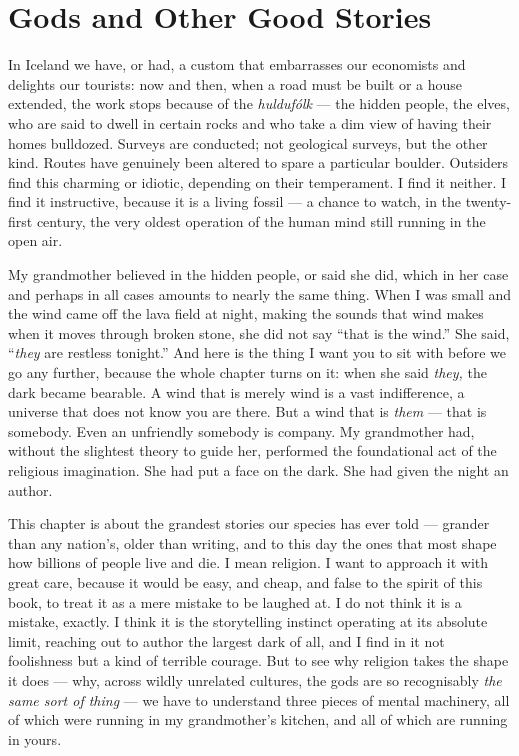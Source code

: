 \chapter{Gods and Other Good Stories}

In Iceland we have, or had, a custom that embarrasses our economists and delights our tourists: now and then, when a road must be built or a house extended, the work stops because of the \emph{huldufólk} — the hidden people, the elves, who are said to dwell in certain rocks and who take a dim view of having their homes bulldozed. Surveys are conducted; not geological surveys, but the other kind. Routes have genuinely been altered to spare a particular boulder. Outsiders find this charming or idiotic, depending on their temperament. I find it neither. I find it instructive, because it is a living fossil — a chance to watch, in the twenty-first century, the very oldest operation of the human mind still running in the open air.

My grandmother believed in the hidden people, or said she did, which in her case and perhaps in all cases amounts to nearly the same thing. When I was small and the wind came off the lava field at night, making the sounds that wind makes when it moves through broken stone, she did not say ``that is the wind.'' She said, ``\emph{they} are restless tonight.'' And here is the thing I want you to sit with before we go any further, because the whole chapter turns on it: when she said \emph{they,} the dark became bearable. A wind that is merely wind is a vast indifference, a universe that does not know you are there. But a wind that is \emph{them} — that is somebody. Even an unfriendly somebody is company. My grandmother had, without the slightest theory to guide her, performed the foundational act of the religious imagination. She had put a face on the dark. She had given the night an author.

This chapter is about the grandest stories our species has ever told — grander than any nation's, older than writing, and to this day the ones that most shape how billions of people live and die. I mean religion. I want to approach it with great care, because it would be easy, and cheap, and false to the spirit of this book, to treat it as a mere mistake to be laughed at. I do not think it is a mistake, exactly. I think it is the storytelling instinct operating at its absolute limit, reaching out to author the largest dark of all, and I find in it not foolishness but a kind of terrible courage. But to see why religion takes the shape it does — why, across wildly unrelated cultures, the gods are so recognisably \emph{the same sort of thing} — we have to understand three pieces of mental machinery, all of which were running in my grandmother's kitchen, and all of which are running in yours.

